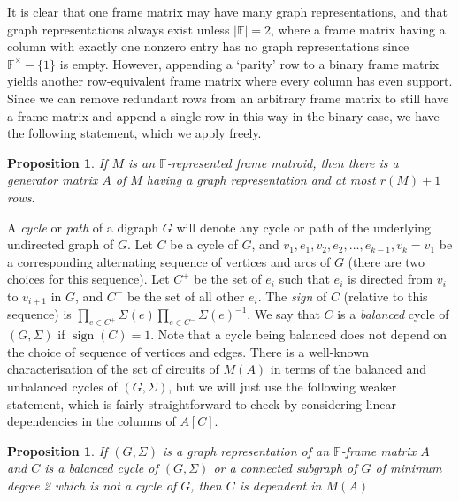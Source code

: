 \documentclass[12pt]{amsart}
\newtheorem{proposition}[theorem]{Proposition}
\theoremstyle{definition}
\newcommand{\bF}{\mathbb F}
\DeclareMathOperator{\sign}{sign}
\begin{document}
   It is clear that one frame matrix may have many graph representations, and that graph representations always exist unless $|\bF| = 2$, where a frame matrix having a column with exactly one nonzero entry has no graph representations since $\bF^{\times}-\{1\}$ is empty. However, appending a `parity' row to a binary frame matrix yields another row-equivalent frame matrix where every column has even support. Since we can remove redundant rows from an arbitrary frame matrix to still have a frame matrix and append a single row in this way in the binary case, we have the following statement, which we apply freely.
   
   \begin{proposition}\label{frameexist}
    If $M$ is an $\bF$-represented frame matroid, then there is a generator matrix $A$ of $M$ having a graph representation and at most $r(M) + 1$ rows.
   \end{proposition}
   
   A \emph{cycle} or \emph{path} of a digraph $G$ will denote any cycle or path of the underlying undirected graph of $G$. Let $C$ be a cycle of $G$, and $v_1,e_1,v_2,e_2,\dotsc,e_{k-1},v_k=v_1$ be a corresponding alternating sequence of vertices and arcs of $G$ (there are two choices for this sequence). Let $C^+$ be the set of $e_i$ such that $e_i$ is directed from $v_i$ to $v_{i+1}$ in $G$, and $C^-$ be the set of all other $e_i$. The \emph{sign} of $C$ (relative to this sequence) is $\prod_{e \in C^+} \Sigma(e) \prod_{e\in C^-} \Sigma(e)^{-1}$. We say that $C$ is a \emph{balanced} cycle of $(G,\Sigma)$ if $\sign(C) = 1$. Note that a cycle being balanced does not depend on the choice of sequence of vertices and edges.
   There is a well-known characterisation of the set of circuits of $M(A)$ in terms of the balanced and unbalanced cycles of $(G,\Sigma)$, but we will just use the following weaker statement, which is fairly straightforward to check by considering linear dependencies in the columns of $A[C]$. 
     
   \begin{proposition}\label{bicycledependent}
    If $(G,\Sigma)$ is a graph representation of an $\bF$-frame matrix $A$ and $C$ is a balanced cycle of $(G,\Sigma)$ or a connected subgraph of $G$ of minimum degree 2 which is not a cycle of $G$, then $C$ is dependent in $M(A)$. 
   \end{proposition}
   
\end{document}
